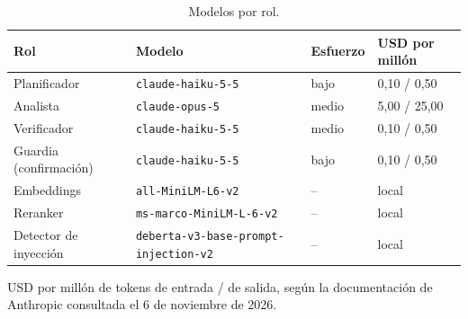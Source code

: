 \begin{table}[htbp]
\centering
\small
\caption{Modelos por rol.}
\label{tab:modelos}
\begin{tabular}{llll}
\toprule
\textbf{Rol} & \textbf{Modelo} & \textbf{Esfuerzo} & \textbf{USD por millón} \\
\midrule
Planificador & \texttt{claude-haiku-5-5} & bajo & 0,10 / 0,50 \\
Analista & \texttt{claude-opus-5} & medio & 5,00 / 25,00 \\
Verificador & \texttt{claude-haiku-5-5} & medio & 0,10 / 0,50 \\
Guardia (confirmación) & \texttt{claude-haiku-5-5} & bajo & 0,10 / 0,50 \\
Embeddings & \texttt{all-MiniLM-L6-v2} & -- & local \\
Reranker & \texttt{ms-marco-MiniLM-L-6-v2} & -- & local \\
Detector de inyección & \texttt{deberta-v3-base-prompt-injection-v2} & -- & local \\
\bottomrule
\end{tabular}
\par\smallskip\parbox{0.92\linewidth}{\footnotesize USD por millón de tokens de entrada / de salida, según la documentación de Anthropic consultada el 6 de noviembre de 2026.}
\end{table}
